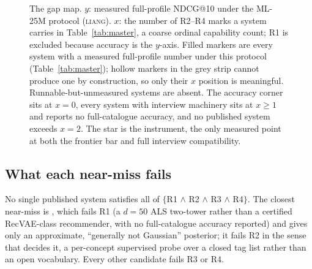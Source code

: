 \documentclass[manuscript,screen,review]{acmart}
\begin{document}
\begin{figure}[t]
\caption{The gap map. $y$: measured full-profile NDCG@10 under the ML-25M protocol (\textsc{liang}). $x$: the number of R2--R4 marks a system carries in Table~\ref{tab:master}, a coarse ordinal capability count; R1 is excluded because accuracy is the $y$-axis. Filled markers are every system with a measured full-profile number under this protocol (Table~\ref{tab:master}); hollow markers in the grey strip cannot produce one by construction, so only their $x$ position is meaningful. Runnable-but-unmeasured systems are absent. The accuracy corner sits at $x{=}0$, every system with interview machinery sits at $x\ge1$ and reports no full-catalogue accuracy, and no published system exceeds $x{=}2$. The star is the instrument, the only measured point at both the frontier bar and full interview compatibility.}
\label{fig:gapmap}
\end{figure}

\subsection{What each near-miss fails}\label{sec:gap}

No single published system satisfies all of $\{$R1 $\wedge$ R2 $\wedge$ R3 $\wedge$ R4$\}$. The closest near-miss is \citet{biyik2023soft}, which fails R1 (a $d{=}50$ ALS two-tower rather than a certified RecVAE-class recommender, with no full-catalogue accuracy reported) and gives only an approximate, ``generally not Gaussian'' posterior; it fails R2 in the sense that decides it, a per-concept supervised probe over a closed tag list rather than an open vocabulary. Every other candidate fails R3 or R4.
\end{document}

